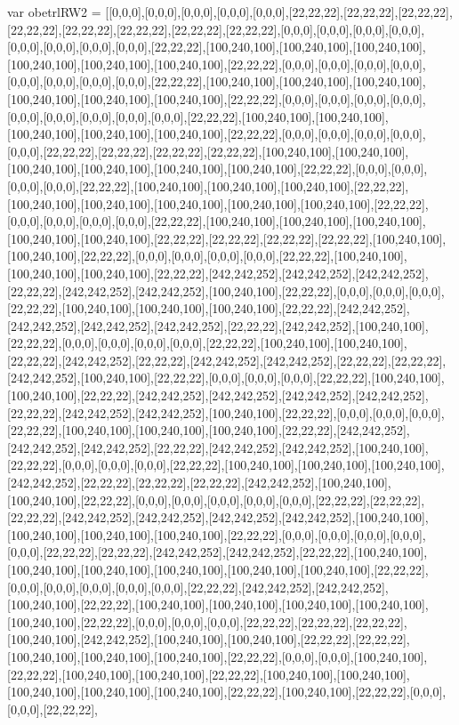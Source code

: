var obetrlRW2 = [[0,0,0],[0,0,0],[0,0,0],[0,0,0],[0,0,0],[22,22,22],[22,22,22],[22,22,22],[22,22,22],[22,22,22],[22,22,22],[22,22,22],[22,22,22],[0,0,0],[0,0,0],[0,0,0],[0,0,0],[0,0,0],[0,0,0],[0,0,0],[0,0,0],[22,22,22],[100,240,100],[100,240,100],[100,240,100],[100,240,100],[100,240,100],[100,240,100],[22,22,22],[0,0,0],[0,0,0],[0,0,0],[0,0,0],[0,0,0],[0,0,0],[0,0,0],[0,0,0],[22,22,22],[100,240,100],[100,240,100],[100,240,100],[100,240,100],[100,240,100],[100,240,100],[22,22,22],[0,0,0],[0,0,0],[0,0,0],[0,0,0],[0,0,0],[0,0,0],[0,0,0],[0,0,0],[0,0,0],[22,22,22],[100,240,100],[100,240,100],[100,240,100],[100,240,100],[100,240,100],[22,22,22],[0,0,0],[0,0,0],[0,0,0],[0,0,0],[0,0,0],[22,22,22],[22,22,22],[22,22,22],[22,22,22],[100,240,100],[100,240,100],[100,240,100],[100,240,100],[100,240,100],[100,240,100],[22,22,22],[0,0,0],[0,0,0],[0,0,0],[0,0,0],[22,22,22],[100,240,100],[100,240,100],[100,240,100],[22,22,22],[100,240,100],[100,240,100],[100,240,100],[100,240,100],[100,240,100],[22,22,22],[0,0,0],[0,0,0],[0,0,0],[0,0,0],[22,22,22],[100,240,100],[100,240,100],[100,240,100],[100,240,100],[100,240,100],[22,22,22],[22,22,22],[22,22,22],[22,22,22],[100,240,100],[100,240,100],[22,22,22],[0,0,0],[0,0,0],[0,0,0],[0,0,0],[22,22,22],[100,240,100],[100,240,100],[100,240,100],[22,22,22],[242,242,252],[242,242,252],[242,242,252],[22,22,22],[242,242,252],[242,242,252],[100,240,100],[22,22,22],[0,0,0],[0,0,0],[0,0,0],[22,22,22],[100,240,100],[100,240,100],[100,240,100],[22,22,22],[242,242,252],[242,242,252],[242,242,252],[242,242,252],[22,22,22],[242,242,252],[100,240,100],[22,22,22],[0,0,0],[0,0,0],[0,0,0],[0,0,0],[22,22,22],[100,240,100],[100,240,100],[22,22,22],[242,242,252],[22,22,22],[242,242,252],[242,242,252],[22,22,22],[22,22,22],[242,242,252],[100,240,100],[22,22,22],[0,0,0],[0,0,0],[0,0,0],[22,22,22],[100,240,100],[100,240,100],[22,22,22],[242,242,252],[242,242,252],[242,242,252],[242,242,252],[22,22,22],[242,242,252],[242,242,252],[100,240,100],[22,22,22],[0,0,0],[0,0,0],[0,0,0],[22,22,22],[100,240,100],[100,240,100],[100,240,100],[22,22,22],[242,242,252],[242,242,252],[242,242,252],[22,22,22],[242,242,252],[242,242,252],[100,240,100],[22,22,22],[0,0,0],[0,0,0],[0,0,0],[22,22,22],[100,240,100],[100,240,100],[100,240,100],[242,242,252],[22,22,22],[22,22,22],[22,22,22],[242,242,252],[100,240,100],[100,240,100],[22,22,22],[0,0,0],[0,0,0],[0,0,0],[0,0,0],[0,0,0],[22,22,22],[22,22,22],[22,22,22],[242,242,252],[242,242,252],[242,242,252],[242,242,252],[100,240,100],[100,240,100],[100,240,100],[100,240,100],[22,22,22],[0,0,0],[0,0,0],[0,0,0],[0,0,0],[0,0,0],[22,22,22],[22,22,22],[242,242,252],[242,242,252],[22,22,22],[100,240,100],[100,240,100],[100,240,100],[100,240,100],[100,240,100],[100,240,100],[22,22,22],[0,0,0],[0,0,0],[0,0,0],[0,0,0],[0,0,0],[22,22,22],[242,242,252],[242,242,252],[100,240,100],[22,22,22],[100,240,100],[100,240,100],[100,240,100],[100,240,100],[100,240,100],[22,22,22],[0,0,0],[0,0,0],[0,0,0],[22,22,22],[22,22,22],[22,22,22],[100,240,100],[242,242,252],[100,240,100],[100,240,100],[22,22,22],[22,22,22],[100,240,100],[100,240,100],[100,240,100],[22,22,22],[0,0,0],[0,0,0],[100,240,100],[22,22,22],[100,240,100],[100,240,100],[22,22,22],[100,240,100],[100,240,100],[100,240,100],[100,240,100],[100,240,100],[22,22,22],[100,240,100],[22,22,22],[0,0,0],[0,0,0],[22,22,22],
